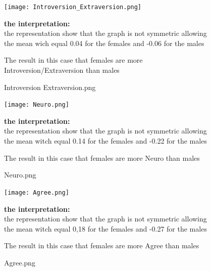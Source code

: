 













\begin{figure}[]
\setlength{\abovecaptionskip}{-4pt}
\begin{center}
\texttt{[image: Introversion\_Extraversion.png]}
  \caption{Introversion Extraversion.png}
  \end{center}


{\normalsize{\bf the interpretation:}} \\\vspace{0.5cm}
the representation show that the graph is not symmetric allowing 
the mean wich equal 0.04  for the females and -0.06  for the males 

The result in this case that females are more Introversion/Extraversion than males
\end{figure}


\begin{figure}[]
\setlength{\abovecaptionskip}{-4pt}
\begin{center}
\texttt{[image: Neuro.png]}
  \caption{Neuro.png}
  \end{center}

{\normalsize{\bf the interpretation:}} \\\vspace{0.5cm}
the representation show that the graph is not symmetric allowing 
the mean witch equal 0.14 for the females and -0.22 for the males 

The result in this case that females are more Neuro  than males
\end{figure}

\begin{figure}[]
\setlength{\abovecaptionskip}{-4pt}
\begin{center}
\texttt{[image: Agree.png]}
  \caption{Agree.png}
  \end{center}

{\normalsize{\bf the interpretation:}} \\\vspace{0.5cm}
the representation show that the graph is not symmetric allowing 
the mean witch equal 0,18 for the females and -0.27 for the males

The result in this case that females are more Agree  than males
\end{figure}

